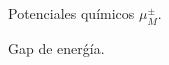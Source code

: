 \documentclass[11pt,letterpaper]{article}
\begin{document}
\begin{figure}%
    \centering
    \caption{Potenciales químicos $\mu^{\pm}_M$.}%
    \label{fig:mus}%
\end{figure}

\begin{figure}%
    \centering
    \caption{Gap de enerǵía.}%
    \label{fig:gap}%
\end{figure}
\end{document}
